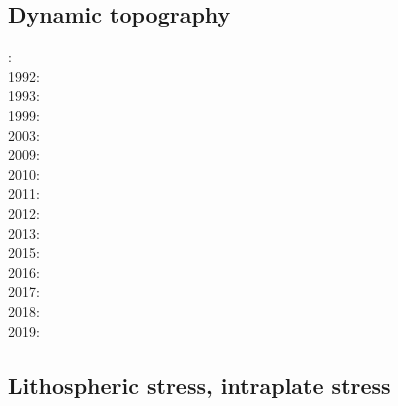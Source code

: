 {\scriptsize
\noindent
\cite{werr07}
\cite{jaml10}
\cite{rera11}
\cite{matv15}
\cite{gubg19}
}

\subsection{Dynamic topography} 

{\scriptsize
{}: \cite{repa87}\\
1992: \cite{kiha92}\\
1993: \cite{gurn93}\cite{gurn93b}\\
1999: \cite{bumo99}\\
2003: \cite{cogu03}\\
2009: \cite{cohu09}\\
2010: \cite{bofb10}\cite{brau10b}\cite{stfh10}\cite{shml10}\\
2011: \cite{rapy11}\\
2012: \cite{shlm12}\cite{zhzf12}\\
2013: \cite{brrs13}\cite{flgm13}\\
2015: \cite{aupm15}\cite{kiff15}\cite{dali15}\\
2016: \cite{howa16}\\
2017: \cite{yamm17}\cite{aumh17}\\
2018: \cite{osss18}\\
2019: \cite{deli19}\cite{davk19}
}

\subsection{Lithospheric stress, intraplate stress}

